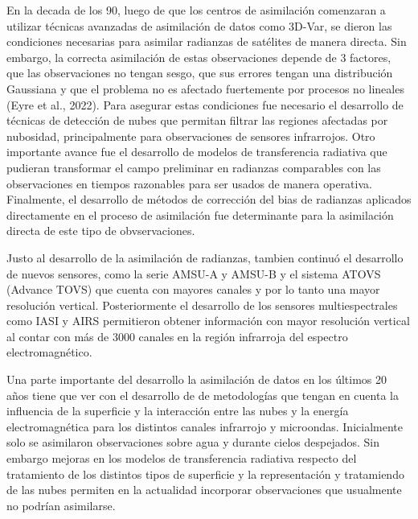 \documentclass[12pt,twoside]{reedthesis}
\begin{document}
En la decada de los 90, luego de que los centros de asimilación comenzaran a utilizar técnicas avanzadas de asimilación de datos como 3D-Var, se dieron las condiciones necesarias para asimilar radianzas de satélites de manera directa. Sin embargo, la correcta asimilación de estas observaciones depende de 3 factores, que las observaciones no tengan sesgo, que sus errores tengan una distribución Gaussiana y que el problema no es afectado fuertemente por procesos no lineales (Eyre et al., 2022). Para asegurar estas condiciones fue necesario el desarrollo de técnicas de detección de nubes que permitan filtrar las regiones afectadas por nubosidad, principalmente para observaciones de sensores infrarrojos. Otro importante avance fue el desarrollo de modelos de transferencia radiativa que pudieran transformar el campo preliminar en radianzas comparables con las observaciones en tiempos razonables para ser usados de manera operativa. Finalmente, el desarrollo de métodos de corrección del bias de radianzas aplicados directamente en el proceso de asimilación fue determinante para la asimilación directa de este tipo de obvservaciones.

Justo al desarrollo de la asimilación de radianzas, tambien continuó el desarrollo de nuevos sensores, como la serie AMSU-A y AMSU-B y el sistema ATOVS (Advance TOVS) que cuenta con mayores canales y por lo tanto una mayor resolución vertical. Posteriormente el desarrollo de los sensores multiespectrales como IASI y AIRS permitieron obtener información con mayor resolución vertical al contar con más de 3000 canales en la región infrarroja del espectro electromagnético.

Una parte importante del desarrollo la asimilación de datos en los últimos 20 años tiene que ver con el desarrollo de de metodologías que tengan en cuenta la influencia de la superficie y la interacción entre las nubes y la energía electromagnética para los distintos canales infrarrojo y microondas. Inicialmente solo se asimilaron observaciones sobre agua y durante cielos despejados. Sin embargo mejoras en los modelos de transferencia radiativa respecto del tratamiento de los distintos tipos de superficie y la representación y tratamiendo de las nubes permiten en la actualidad incorporar observaciones que usualmente no podrían asimilarse.
\end{document}
